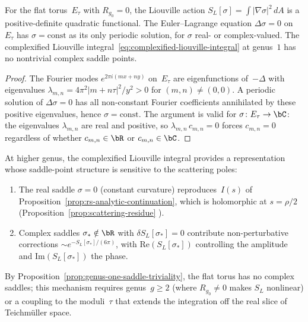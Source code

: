 \begin{proposition}%
\label{prop:genus-one-saddle-triviality}%
\ClaimStatusProvedHere%
%
For the flat torus~$E_\tau$ with $R_{g_0} = 0$, the
Liouville action $S_L[\sigma] = \int\lvert\nabla\sigma
\rvert^2\,dA$ is a positive-definite quadratic functional.
The Euler--Lagrange equation $\Delta\sigma = 0$ on~$E_\tau$
has $\sigma = \mathrm{const}$ as its only periodic solution,
for $\sigma$ real- or complex-valued. The complexified
Liouville integral~\eqref{eq:complexified-liouville-integral}
at genus~$1$ has no nontrivial complex saddle points.
\end{proposition}

\begin{proof}
The Fourier modes $e^{2\pi i(mx + ny)}$ on~$E_\tau$ are
eigenfunctions of~$-\Delta$ with eigenvalues
$\lambda_{m,n} = 4\pi^2\lvert m+n\tau\rvert^2/y^2 > 0$
for $(m,n) \ne (0,0)$. A periodic solution of
$\Delta\sigma = 0$ has all non-constant Fourier coefficients
annihilated by these positive eigenvalues, hence
$\sigma = \mathrm{const}$. The argument is valid for
$\sigma\colon E_\tau \to \bC$: the eigenvalues
$\lambda_{m,n}$ are real and positive, so
$\lambda_{m,n}\,c_{m,n} = 0$ forces $c_{m,n} = 0$
regardless of whether $c_{m,n} \in \bR$ or $c_{m,n} \in \bC$.
\end{proof}

\begin{conjecture}%
\label{conj:complex-saddle-scattering}%
\ClaimStatusConjectured%
%
%
At higher genus, the complexified Liouville integral
provides a representation whose saddle-point structure is
sensitive to the scattering poles:
\begin{enumerate}[label=\textup{(\roman*)}]
\item The real saddle $\sigma = 0$ \textup{(}constant
 curvature\textup{)} reproduces~$I(s)$ of
 Proposition~\textup{\ref{prop:rs-analytic-continuation}},
 which is holomorphic at $s = \rho/2$
 \textup{(}Proposition~\textup{\ref{prop:scattering-residue}%
 }\textup{)}.
\item Complex saddles $\sigma_*\notin\bR$ with
 $\delta S_L[\sigma_*] = 0$ contribute non-perturbative
 corrections $\sim e^{-S_L[\sigma_*]/(6\pi)}$, with
 $\mathrm{Re}(S_L[\sigma_*])$ controlling the amplitude
 and $\mathrm{Im}(S_L[\sigma_*])$ the phase.
\end{enumerate}
By Proposition~\textup{\ref{prop:genus-one-saddle-triviality}},
the flat torus has no complex saddles; this mechanism requires
genus~$g \ge 2$ \textup{(}where $R_{g_0}\ne 0$ makes $S_L$
nonlinear\textup{)} or a coupling to the moduli~$\tau$ that
extends the integration off the real slice of Teichm\"uller
space.
\end{conjecture}

